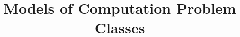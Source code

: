 \documentclass[a4paper, answers]{exam}
\title{Models of Computation Problem Classes}
\author{}
\begin{document}
    \maketitle
    \begin{questions}
        
        
        
        
    \end{questions}
\end{document}
